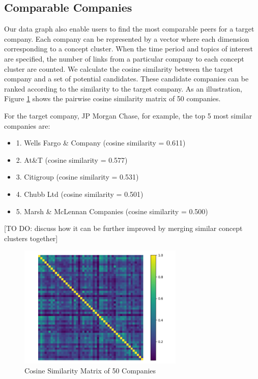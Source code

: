 \subsection{Comparable Companies}

Our data graph also enable users to find the most comparable peers for a target company. Each company can be represented by a vector where each dimension corresponding to a concept cluster. When the time period and topics of interest are specified, the number of links from a particular company to each concept cluster are counted. We calculate the cosine similarity between the target company and a set of potential candidates. These candidate companies can be ranked according to the similarity to the target company. As an illustration, Figure \ref{fig:simMatrix} shows the pairwise cosine similarity matrix of 50 companies. 

For the target company, JP Morgan Chase, for example, the top 5 most similar companies are:
\begin{itemize}
	\item 1. Wells Fargo \& Company (cosine similarity = 0.611)
	\item 2. At\&T (cosine similarity = 0.577)
	\item 3. Citigroup (cosine similarity = 0.531)
	\item 4. Chubb Ltd (cosine similarity = 0.501)
	\item 5. Marsh \& McLennan Companies (cosine similarity = 0.500)
\end{itemize}

[TO DO: discuss how it can be further improved by merging similar concept clusters together]

\begin{figure}
     \centering
     \includegraphics[width=0.7\textwidth]{figures/SimilarityMatrix.png}
     \caption{Cosine Similarity Matrix of 50 Companies}
	\label{fig:simMatrix}
\end{figure}




